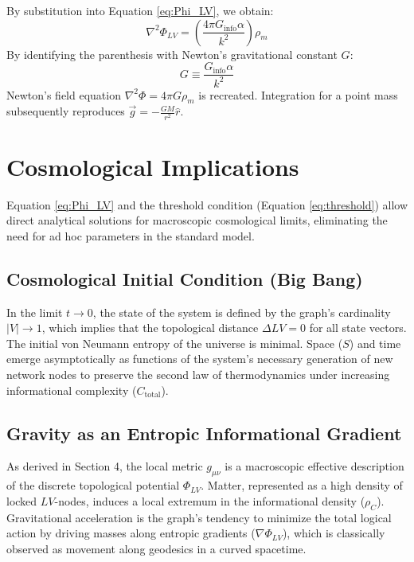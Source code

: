 \documentclass[12pt,a4paper]{article}
\begin{document}
By substitution into Equation \ref{eq:Phi_LV}, we obtain:
\begin{equation}
\nabla^2 \Phi_{LV} = \left( \frac{4\pi G_{\mathrm{info}} \alpha}{k^2} \right) \rho_m
\end{equation}
By identifying the parenthesis with Newton's gravitational constant $G$:
\begin{equation}
G \equiv \frac{G_{\mathrm{info}} \alpha}{k^2}
\end{equation}
Newton's field equation $\nabla^2 \Phi = 4\pi G \rho_m$ is recreated. Integration for a point mass subsequently reproduces $\vec{g} = -\frac{GM}{r^2} \hat{r}$.

\section{Cosmological Implications}

Equation \ref{eq:Phi_LV} and the threshold condition (Equation \ref{eq:threshold}) allow direct analytical solutions for macroscopic cosmological limits, eliminating the need for ad hoc parameters in the standard model.

\subsection{Cosmological Initial Condition (Big Bang)}
In the limit $t \to 0$, the state of the system is defined by the graph's cardinality $|V| \to 1$, which implies that the topological distance $\Delta LV = 0$ for all state vectors. The initial von Neumann entropy of the universe is minimal. Space ($S$) and time emerge asymptotically as functions of the system's necessary generation of new network nodes to preserve the second law of thermodynamics under increasing informational complexity ($C_{\mathrm{total}}$).

\subsection{Gravity as an Entropic Informational Gradient}
As derived in Section 4, the local metric $g_{\mu\nu}$ is a macroscopic effective description of the discrete topological potential $\Phi_{LV}$. Matter, represented as a high density of locked $LV$-nodes, induces a local extremum in the informational density ($\rho_C$). Gravitational acceleration is the graph's tendency to minimize the total logical action by driving masses along entropic gradients ($\nabla \Phi_{LV}$), which is classically observed as movement along geodesics in a curved spacetime.
\end{document}
